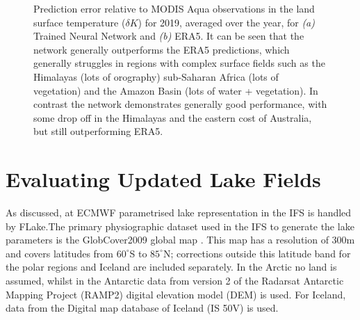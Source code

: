 \documentclass[twocolumn]{article}
\begin{document}
\begin{figure}
	 \hspace{1mm}
	\caption{Prediction error relative to MODIS Aqua observations in the land surface temperature  ($\delta K$) for 2019, averaged over the year, for \textit{(a)} Trained Neural Network and \textit{(b) }ERA5. It can be seen that the network generally outperforms the ERA5 predictions, which generally struggles in regions with complex surface fields such as the Himalayas (lots of orography) sub-Saharan Africa (lots of vegetation) and the Amazon Basin (lots of water + vegetation). In contrast the network demonstrates generally good performance, with some drop off in the Himalayas and the eastern cost of Australia, but still outperforming ERA5.} 
	\label{fig:example_model}
\end{figure}



\section{Evaluating Updated Lake Fields}\label{sec:3}
As discussed, at ECMWF parametrised lake representation in the IFS is handled by FLake.The primary physiographic dataset used in the IFS to generate the lake parameters is the GlobCover2009 global map  \cite{GLOBCOVER}\cite{arino2012glcm}. This map has a resolution of 300m and covers latitudes from $60^{\circ}$S to $85^{\circ}$N; corrections outside this latitude band for the polar regions and Iceland are included separately.  In the Arctic no land is assumed, whilst in the Antarctic data from version 2 of the Radarsat Antarctic Mapping Project (RAMP2) digital elevation model (DEM) is used\cite{Liu2015}. For Iceland, data from the Digital map database of Iceland (IS 50V) is used. \newline 
\end{document}
